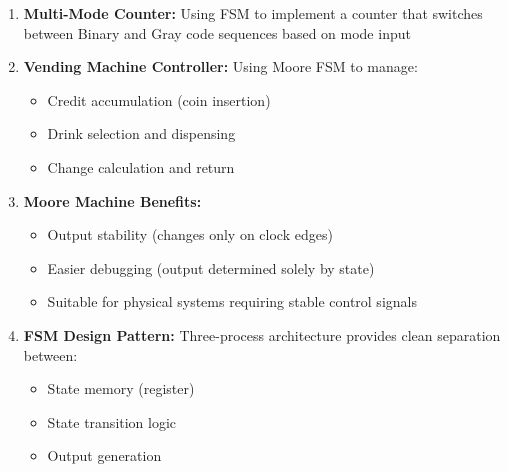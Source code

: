 \documentclass[12pt,a4paper]{article}
\begin{document}
\begin{enumerate}
    \item \textbf{Multi-Mode Counter:} Using FSM to implement a counter that switches between Binary and Gray code sequences based on mode input
    
    \item \textbf{Vending Machine Controller:} Using Moore FSM to manage:
    \begin{itemize}
        \item Credit accumulation (coin insertion)
        \item Drink selection and dispensing
        \item Change calculation and return
    \end{itemize}
    
    \item \textbf{Moore Machine Benefits:}
    \begin{itemize}
        \item Output stability (changes only on clock edges)
        \item Easier debugging (output determined solely by state)
        \item Suitable for physical systems requiring stable control signals
    \end{itemize}
    
    \item \textbf{FSM Design Pattern:} Three-process architecture provides clean separation between:
    \begin{itemize}
        \item State memory (register)
        \item State transition logic
        \item Output generation
    \end{itemize}
\end{enumerate}
\end{document}
